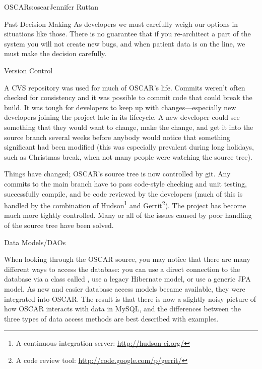 \begin{aosachapter}{OSCAR}{s:oscar}{Jennifer Ruttan}
\begin{aosasect1}{Past Decision Making}
As developers we must carefully weigh our options in situations like
those. There is no guarantee that if you re-architect a part of the
system you will not create new bugs, and when patient data is on the
line, we must make the decision carefully.

\end{aosasect1}

\begin{aosasect1}{Version Control}

A CVS repository was used for much of OSCAR's
life. Commits weren't often checked for consistency and it was
possible to commit code that could break the build. It was tough for
developers to keep up with changes---especially new developers joining
the project late in its lifecycle. A new developer could see something
that they would want to change, make the change, and get it into the
source branch several weeks before anybody would notice that something
significant had been modified (this was especially prevalent during
long holidays, such as Christmas break, when not many people were
watching the source tree).

Things have changed; OSCAR's source tree is now controlled by
git. Any commits to the main branch have to pass code-style checking and
unit testing, successfully compile, and be code reviewed by the
developers (much of this is handled by the combination of Hudson\footnote{A
continuous integration server: \url{http://hudson-ci.org/}} and
Gerrit\footnote{A code review tool: \url{http://code.google.com/p/gerrit/}}). 
The project has become much more tightly controlled. Many
or all of the issues caused by poor handling of the
source tree have been solved.

\end{aosasect1}

\begin{aosasect1}{Data Models/DAOs}

When looking through the OSCAR source, you may notice that there are
many different ways to access the database: you can use a direct
connection to the database via a class called , use a
legacy Hibernate model, or use a generic JPA model. As new and easier
database access models became available, they were integrated into
OSCAR. The result is that there is now a slightly noisy picture of how
OSCAR interacts with data in MySQL, and the differences between the
three types of data access methods are best described with examples.

\end{aosasect1}


\end{aosachapter}
